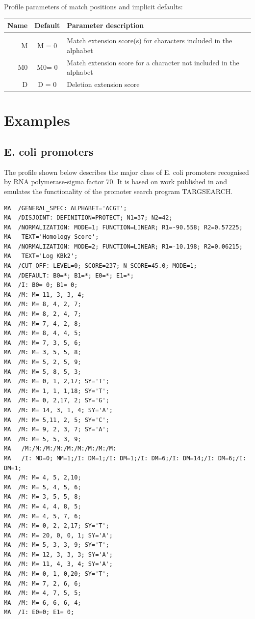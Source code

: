 \documentclass[a4paper,10pt,twoside]{scrartcl}
\begin{document}
  Profile parameters of match positions and implicit defaults:
  \begin{center}
  \begin{tabular}{rcl}
  Name & Default & Parameter description \\
  \hline \\
  M   &M = 0  &Match extension score(s) for characters included in the alphabet\\
  M0  &M0= 0  &Match extension score for a character not included in the alphabet\\
  D   &D = 0  &Deletion extension score\\
  \hline
  \end{tabular}
  \end{center}
  
  \section{Examples} \label{Examples}

  \subsection{E. coli promoters}

  The profile shown below describes the major class of E. coli promoters
  recognised by RNA polymerase-sigma factor 70. It is based on work published in \cite{Mulligan84} and emulates the functionality of the promoter search program TARGSEARCH.

  \begin{verbatim}
MA  /GENERAL_SPEC: ALPHABET='ACGT';
MA  /DISJOINT: DEFINITION=PROTECT; N1=37; N2=42;
MA  /NORMALIZATION: MODE=1; FUNCTION=LINEAR; R1=-90.558; R2=0.57225;
MA   TEXT='Homology Score';
MA  /NORMALIZATION: MODE=2; FUNCTION=LINEAR; R1=-10.198; R2=0.06215;
MA   TEXT='Log KBk2';
MA  /CUT_OFF: LEVEL=0; SCORE=237; N_SCORE=45.0; MODE=1;
MA  /DEFAULT: B0=*; B1=*; E0=*; E1=*;
MA  /I: B0= 0; B1= 0;
MA  /M: M= 11, 3, 3, 4;
MA  /M: M= 8, 4, 2, 7;
MA  /M: M= 8, 2, 4, 7;
MA  /M: M= 7, 4, 2, 8;
MA  /M: M= 8, 4, 4, 5;
MA  /M: M= 7, 3, 5, 6;
MA  /M: M= 3, 5, 5, 8;
MA  /M: M= 5, 2, 5, 9;
MA  /M: M= 5, 8, 5, 3;
MA  /M: M= 0, 1, 2,17; SY='T';
MA  /M: M= 1, 1, 1,18; SY='T';
MA  /M: M= 0, 2,17, 2; SY='G';
MA  /M: M= 14, 3, 1, 4; SY='A';
MA  /M: M= 5,11, 2, 5; SY='C';
MA  /M: M= 9, 2, 3, 7; SY='A';
MA  /M: M= 5, 5, 3, 9;
MA   /M:/M:/M:/M:/M:/M:/M:/M:/M:
MA   /I: MD=0; MM=1;/I: DM=1;/I: DM=1;/I: DM=6;/I: DM=14;/I: DM=6;/I: DM=1;
MA  /M: M= 4, 5, 2,10;
MA  /M: M= 5, 4, 5, 6;
MA  /M: M= 3, 5, 5, 8;
MA  /M: M= 4, 4, 8, 5;
MA  /M: M= 4, 5, 7, 6;
MA  /M: M= 0, 2, 2,17; SY='T';
MA  /M: M= 20, 0, 0, 1; SY='A';
MA  /M: M= 5, 3, 3, 9; SY='T';
MA  /M: M= 12, 3, 3, 3; SY='A';
MA  /M: M= 11, 4, 3, 4; SY='A';
MA  /M: M= 0, 1, 0,20; SY='T';
MA  /M: M= 7, 2, 6, 6;
MA  /M: M= 4, 7, 5, 5;
MA  /M: M= 6, 6, 6, 4;
MA  /I: E0=0; E1= 0;
\end{verbatim}
\end{document}
